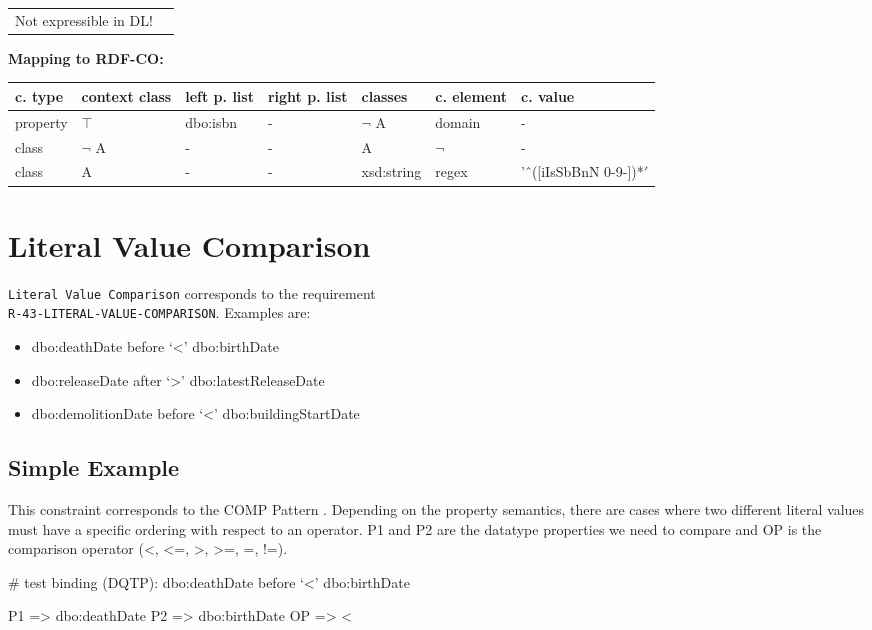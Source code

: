 \documentclass{llncs}
\newcommand{\ms}[1]{\texttt{#1}}
\newenvironment{gcotable}{
  \scriptsize
  \sffamily
  \vspace{0cm}
	\begin{center}
	\textbf{\vspace{0.4cm}Mapping to RDF-CO:} \\
  \begin{tabular}{l|l|l|l|l|l|l}
	\hline
  \textbf{c. type} & \textbf{context class} & \textbf{left p. list} & \textbf{right p. list} & \textbf{classes} & \textbf{c. element} & \textbf{c. value} \\
  \hline

}{
  \hline
  \end{tabular}
	\end{center}
}
\newenvironment{DL}{
  \vspace{0cm}
	\begin{center}
  \begin{tabular}{r l}

}{
  \end{tabular}
	\end{center}
}
\begin{document}
\begin{DL}
Not expressible in DL!
\end{DL}

\begin{gcotable}
property & $\top$ & dbo:isbn & - & $\neg$ A & domain & - \\
class & $\neg$ A & - & - & A & $\neg$ & - \\
class & A & - & - & xsd:string & regex & 'ˆ([iIsSbBnN 0-9-])*$' $ \\
\end{gcotable}

\section{Literal Value Comparison}

\ms{Literal Value Comparison} corresponds to the requirement \\
\ms{R-43-LITERAL-VALUE-COMPARISON}.
Examples are:

\begin{itemize}
	\item dbo:deathDate before ‘\textless’ dbo:birthDate
  \item dbo:releaseDate after ‘\textgreater’ dbo:latestReleaseDate
  \item dbo:demolitionDate before ‘\textless’ dbo:buildingStartDate
\end{itemize}

\subsection{Simple Example}


This constraint corresponds to the COMP Pattern \cite{Kontokostas2014}. 
Depending on the property semantics,
there are cases where two different literal values must have
a specific ordering with respect to an operator. 
P1 and P2 are the datatype properties we need to compare and 
OP is the comparison operator (\textless, \textless=, \textgreater, \textgreater=, =, !=). 

\begin{ex}
# test binding (DQTP):
dbo:deathDate before ‘<’ dbo:birthDate

P1 => dbo:deathDate
P2 => dbo:birthDate
OP => <
\end{ex}
\end{document}
